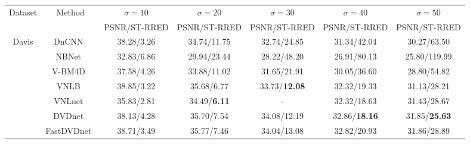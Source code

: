 \documentclass[journal]{IEEEtran}
\begin{document}
\begin{center}
\begin{table*}[ht]
{\vspace{-1.4mm}
\label{tab:2}
\begin{tabular}{|c|c|cl|cl|cl|cl|cl|}
\hline
\multirow{2}{*}{Dataset}   & \multirow{2}{*}{Method} & \multicolumn{2}{c|}{$\sigma=10$}          & \multicolumn{2}{c|}{$\sigma=20$}          & \multicolumn{2}{c|}{$\sigma=30$}          & \multicolumn{2}{c|}{$\sigma=40$}          & \multicolumn{2}{c|}{$\sigma=50$}           \\ \cline{3-12} 
                           &                        & \multicolumn{2}{c|}{PSNR/ST-RRED} & \multicolumn{2}{c|}{PSNR/ST-RRED} & \multicolumn{2}{c|}{PSNR/ST-RRED} & \multicolumn{2}{c|}{PSNR/ST-RRED} & \multicolumn{2}{c|}{PSNR/ST-RRED}  \\ \hline
\multirow{10}{*}{Davis}    & DnCNN~\cite{Zhang2017BeyondAG}                  & \multicolumn{2}{c|}{38.28/3.26}  & \multicolumn{2}{c|}{34.74/11.75} & \multicolumn{2}{c|}{32.74/24.85} & \multicolumn{2}{c|}{31.34/42.04} & \multicolumn{2}{c|}{30.27/63.50}  \\
                          & NBNet~\cite{Cheng2020NBNetNB}                 & \multicolumn{2}{c|}{32.83/6.86}  & \multicolumn{2}{c|}{29.94/23.44} & \multicolumn{2}{c|}{28.22/48.20} & \multicolumn{2}{c|}{26.91/80.13} & \multicolumn{2}{c|}{25.80/119.99} \\
                          & V-BM4D~\cite{Maggioni2012VideoDD}                 & \multicolumn{2}{c|}{37.58/4.26}  & \multicolumn{2}{c|}{33.88/11.02} & \multicolumn{2}{c|}{31.65/21.91} & \multicolumn{2}{c|}{30.05/36.60} & \multicolumn{2}{c|}{28.80/54.82}  \\
                          & VNLB~\cite{Arias2017VideoDV}                  & \multicolumn{2}{c|}{38.85/3.22}  & \multicolumn{2}{c|}{35.68/6.77}  & \multicolumn{2}{c|}{33.73/\textbf{12.08}} & \multicolumn{2}{c|}{32.32/19.33} & \multicolumn{2}{c|}{31.13/28.21}  \\
                          & VNLnet~\cite{Davy2018NonLocalVD}                & \multicolumn{2}{c|}{35.83/2.81}  & \multicolumn{2}{c|}{34.49/\textbf{6.11}}  & \multicolumn{2}{c|}{ - }           & \multicolumn{2}{c|}{32.32/18.63} & \multicolumn{2}{c|}{31.43/28.67}  \\
                          & DVDnet~\cite{Tassano2019DVDNETAF}                 & \multicolumn{2}{c|}{38.13/4.28}  & \multicolumn{2}{c|}{35.70/7.54}  & \multicolumn{2}{c|}{34.08/12.19} & \multicolumn{2}{c|}{32.86/\textbf{18.16}} & \multicolumn{2}{c|}{31.85/\textbf{25.63}} \\
                          & FastDVDnet~\cite{Tassano2020FastDVDnetTR}             & \multicolumn{2}{c|}{38.71/3.49}  & \multicolumn{2}{c|}{35.77/7.46}  & \multicolumn{2}{c|}{34.04/13.08} & \multicolumn{2}{c|}{32.82/20.93} & \multicolumn{2}{c|}{31.86/28.89}  \\

\end{tabular}}
\end{table*}
\end{center}
\end{document}
